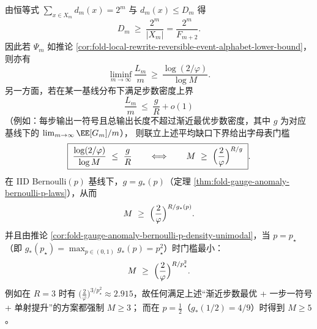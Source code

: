 \begin{remark}[平均缺口驱动的字母表下界]\label{rem:fold-local-rewrite-average-gap-alphabet-bound}
由恒等式 \(\sum_{x\in X_m}d_m(x)=2^m\) 与 \(d_m(x)\le D_m\) 得
\[
D_m\ \ge\ \frac{2^m}{|X_m|}=\frac{2^m}{F_{m+2}}.
\]
因此若 \(\Psi_m\) 如推论 \ref{cor:fold-local-rewrite-reversible-event-alphabet-lower-bound}，则亦有
\[
\liminf_{m\to\infty}\frac{L_m}{m}\ \ge\ \frac{\log(2/\varphi)}{\log M}.
\]
另一方面，若在某一基线分布下满足步数密度上界
\[
\frac{L_m}{m}\ \le\ \frac{g}{R}+o(1)
\]
（例如：每步输出一符号且总输出长度不超过渐近最优步数密度，其中 \(g\) 为对应基线下的 \(\lim_{m\to\infty}\EE[G_m]/m\)），
则联立上述平均缺口下界给出字母表门槛
\[
\boxed{\;
\frac{\log(2/\varphi)}{\log M}\ \le\ \frac{g}{R}
\qquad\Longleftrightarrow\qquad
M\ \ge\ \Bigl(\frac{2}{\varphi}\Bigr)^{R/g}\; }.
\]
在 IID Bernoulli\((p)\) 基线下，\(g=g_\ast(p)\)（定理 \ref{thm:fold-gauge-anomaly-bernoulli-p-laws}），从而
\[
M\ \ge\ \Bigl(\frac{2}{\varphi}\Bigr)^{R/g_\ast(p)}.
\]
并且由推论 \ref{cor:fold-gauge-anomaly-bernoulli-p-density-unimodal}，当 \(p=p_\star\)（即 \(g_\ast(p_\star)=\max_{p\in(0,1)}g_\ast(p)=p_\star^2\)）时门槛最小：
\[
M\ \ge\ \Bigl(\frac{2}{\varphi}\Bigr)^{R/p_\star^2}.
\]
例如在 \(R=3\) 时有 \(\bigl(\frac{2}{\varphi}\bigr)^{3/p_\star^2}\approx 2.915\)，故任何满足上述“渐近步数最优 + 一步一符号 + 单射提升”的方案都强制 \(M\ge 3\)；
而在 \(p=\tfrac12\)（\(g_\ast(1/2)=4/9\)）时得到 \(M\ge 5\)。
\end{remark}

